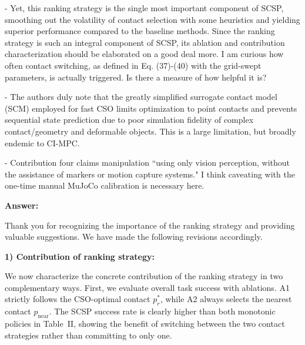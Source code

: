 \documentclass[journal,10pt]{IEEEtran}
\newcommand{\answer}{\par\smallskip\noindent\color{black}\textbf{Answer: }\ignorespaces
}
\begin{document}
- Yet, this ranking strategy is the single most important component of
SCSP, smoothing out the volatility of contact selection with some
heuristics and yielding superior performance compared to the baseline
methods. Since the ranking strategy is such an integral component of
SCSP, its ablation and contribution characterization should be
elaborated on a good deal more. I am curious how often contact
switching, as defined in Eq. (37)-(40) with the grid-swept parameters, is
actually triggered. Is there a measure of how helpful it is?

- The authors duly note that the greatly simplified surrogate contact
model (SCM) employed for fast CSO limits optimization to point contacts
and prevents sequential state prediction due to poor simulation
fidelity of complex contact/geometry and deformable objects. This is a
large limitation, but broadly endemic to CI-MPC.

- Contribution four claims manipulation ``using only vision perception,
without the assistance of markers or motion capture systems." I think
caveating with the one-time manual MuJoCo calibration is necessary
here.

\answer
Thank you for recognizing the importance of the ranking strategy and
providing valuable suggestions. We have made the following revisions
accordingly.

\textbf{1) Contribution of ranking strategy:}

We now characterize the concrete contribution of the ranking strategy in two complementary ways. First, we evaluate overall task success with ablations. A1 strictly follows the CSO-optimal contact $p_r^*$, while A2 always selects the nearest contact $p_{\mathrm{near}}$. The SCSP success rate is clearly higher than both monotonic policies in Table~II, showing the benefit of switching between the two contact strategies rather than committing to only one.
\end{document}
